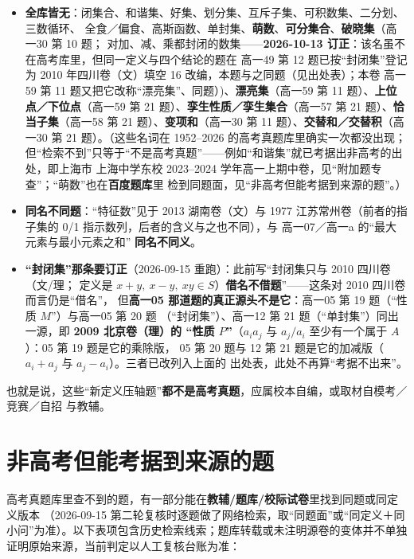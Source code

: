 \documentclass[a4paper,11pt]{article}
\providecommand{\tightlist}{%
  \setlength{\itemsep}{0pt}\setlength{\parskip}{0pt}}
\begin{document}
\begin{itemize}
\tightlist
\item
  \textbf{全库皆无}：闭集合、和谐集、好集、划分集、互斥子集、可积数集、二分划、三数循环、
  全食／偏食、高斯函数、单封集、\textbf{萌数}、\textbf{可分集合}、\textbf{破晓集}（高一30 第 10 题；
  对加、减、乘都封闭的数集------\textbf{2026-10-13 订正}：该名虽不在高考库里，但同一定义与四个结论的题在 高一49 第 12 题已按``封闭集''登记为 2010 年四川卷（文）填空 16 改编，本题与之同题（见出处表）；本卷 高一59 第 11 题又把它改称``漂亮集''、同题）)、\textbf{漂亮集}（高一59 第 11 题）、\textbf{上位点／下位点}（高一59 第 21 题）、\textbf{孪生性质／孪生集合}（高一57 第 21 题）、\textbf{恰当子集}（高一58 第 21 题）、\textbf{变项和}（高一30 第 11 题）、\textbf{交替和／交替积}（高一30 第 21 题）。（这些名词在 1952--2026 的高考真题库里确实一次都没出现；
  但``检索不到''只等于``不是高考真题''------例如``和谐集''就已考据出非高考的出处，即上海市
  上海中学东校 2023--2024 学年高一上期中卷，见``附加题专查''；``萌数''也在\textbf{百度题库}里
  检到同题面，见``非高考但能考据到来源的题''。）
\item
  \textbf{同名不同题}：``特征数''见于 2013 湖南卷（文）与 1977 江苏常州卷（前者的指子集的 0/1
  指示数列，后者的含义与之也不同），与 高一07／高一a 的``最大元素与最小元素之和''
  \textbf{同名不同义}。
\item
  \textbf{``封闭集''那条要订正}（2026-09-15 重跑）：此前写``封闭集只与 2010 四川卷（文/理；
  定义是 \(x+y,\ x-y,\ xy\in S\)）\textbf{借名不借题}''------这条对 2010 四川卷而言仍是``借名''，
  但\textbf{高一05 那道题的真正源头不是它}：高一05 第 19 题（``性质 \(M\)''）与高一05 第 20 题
  （``封闭集''）、高一12 第 21 题（``单封集''）同出一源，即 \textbf{2009 北京卷（理）的
  ``性质 \(P\)''}（\(a_ia_j\) 与 \(a_j/a_i\) 至少有一个属于 \(A\)）：05 第 19 题是它的乘除版，
  05 第 20 题与 12 第 21 题是它的加减版（\(a_i+a_j\) 与 \(a_j-a_i\)）。三者已改列入上面的
  出处表，此处不再算``考据不出来''。
\end{itemize}

也就是说，这些``新定义压轴题''\textbf{都不是高考真题}，应属校本自编，或取材自模考／竞赛／自招
与教辅。

\clearpage
\section{非高考但能考据到来源的题}

高考真题库里查不到的题，有一部分能在\textbf{教辅/题库/校际试卷}里找到同题或同定义版本
（2026-09-15 第二轮复核时逐题做了网络检索，取``同题面''或``同定义＋同小问''为准）。以下表项包含历史检索线索；题库转载或未注明源卷的变体并不单独证明原始来源，当前判定以人工复核台账为准：
\end{document}
